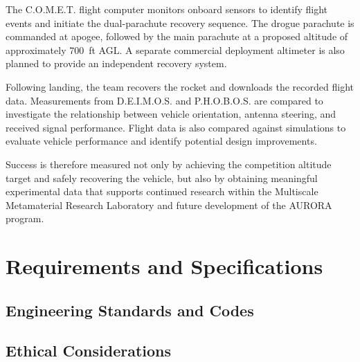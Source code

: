 \documentclass[11pt]{IEEEtran}
\newcommand{\comet}{C.O.M.E.T.}
\newcommand{\phobos}{P.H.O.B.O.S.}
\newcommand{\deimos}{D.E.I.M.O.S.}
\begin{document}
The \comet{} flight computer monitors onboard sensors to identify flight events and initiate the dual-parachute recovery sequence.
The drogue parachute is commanded at apogee, followed by the main parachute at a proposed altitude of approximately 700~ft AGL.
A separate commercial deployment altimeter is also planned to provide an independent recovery system.

Following landing, the team recovers the rocket and downloads the recorded flight data.
Measurements from \deimos{} and \phobos{} are compared to investigate the relationship between vehicle orientation, antenna steering, and received signal performance.
Flight data is also compared against simulations to evaluate vehicle performance and identify potential design improvements.

Success is therefore measured not only by achieving the competition altitude target and safely recovering the vehicle, but also by obtaining meaningful experimental data that supports continued research within the Multiscale Metamaterial Research Laboratory and future development of the AURORA program.

\section{Requirements and Specifications}


\subsection{Engineering Standards and Codes}

\subsection{Ethical Considerations}
\end{document}
